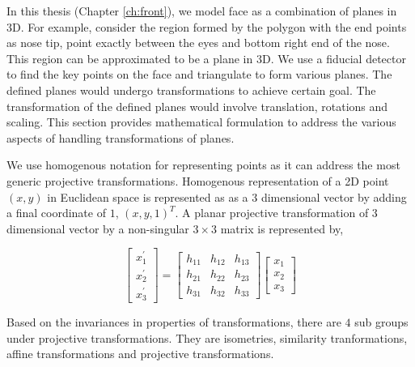
In this thesis (Chapter \ref{ch:front}), we model face as a combination of planes in 3D. For example, consider the region
formed by the polygon with the end points as nose tip, point exactly between the eyes and bottom right
end of the nose. This region can be approximated to be a plane in 3D. We use a fiducial detector to 
find the key points on the face and triangulate to form various planes. The defined planes would undergo
transformations to achieve certain goal. The transformation of the defined planes would involve translation, 
rotations and scaling. This section provides mathematical formulation to address the various aspects of 
handling transformations of planes.

We use homogenous notation for representing points as it can address the most generic projective 
transformations. Homogenous representation of a 2D point $(x, y)$ in Euclidean space is represented as 
as a $3$ dimensional vector by adding a final coordinate of $1$, $(x, y, 1)^T$. A planar projective 
transformation of $3$ dimensional vector by a non-singular $3 \times 3$ matrix is represented by,

\[
\begin{bmatrix}
x_1^{\prime} \\
x_2^{\prime} \\
x_3^{\prime} 
\end{bmatrix}
=
\begin{bmatrix}
h_{11} & h_{12} & h_{13} \\
h_{21} & h_{22} & h_{23} \\
h_{31} & h_{32} & h_{33} 
\end{bmatrix}
\begin{bmatrix}
x_1 \\
x_2 \\
x_3 
\end{bmatrix}
\label{eqn:homogenous}
\]

Based on the invariances in properties of transformations, there are $4$ sub groups under projective 
transformations. They are isometries, similarity tranformations, affine transformations and projective
transformations. 


